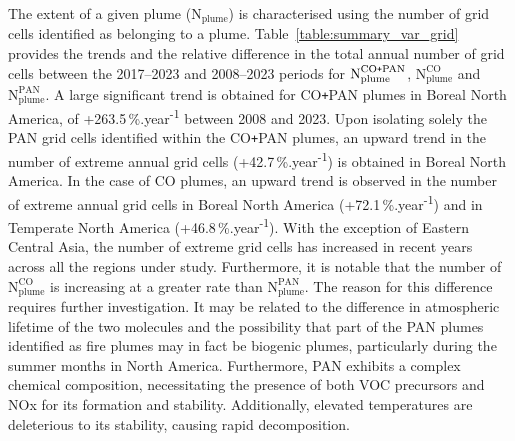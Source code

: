 \documentclass[acp, manuscript]{copernicus}
\begin{document}
The extent of a given plume ($\text{N}_{\text{plume}}$) is characterised using the number of grid cells identified as belonging to a plume. Table~\ref{table:summary_var_grid} provides the trends and the relative difference in the total annual number of grid cells between the 2017--2023 and 2008--2023 periods for $\text{N}_{\text{plume}}^{\text{CO\texttt{+}PAN}}$, $\text{N}_{\text{plume}}^{\text{CO}}$ and $\text{N}_{\text{plume}}^{\text{PAN}}$.
A large significant trend is obtained for CO\texttt{+}PAN plumes in Boreal North America, of +263.5\,\%.year\textsuperscript{-1} between 2008 and 2023. 
Upon isolating solely the PAN grid cells identified within the CO\texttt{+}PAN plumes, an upward trend in the number of extreme annual grid cells (+42.7\,\%.year\textsuperscript{-1}) is obtained in Boreal North America. In the case of CO plumes, an upward trend is observed in the number of extreme annual grid cells in Boreal North America (+72.1\,\%.year\textsuperscript{-1}) and in Temperate North America (+46.8\,\%.year\textsuperscript{-1}).
With the exception of Eastern Central Asia, the number of extreme grid cells has increased in recent years across all the regions under study. Furthermore, it is notable that the number of $\text{N}_{\text{plume}}^{\text{CO}}$ is increasing at a greater rate than $\text{N}_{\text{plume}}^{\text{PAN}}$. 
The reason for this difference requires further investigation. It may be related to the difference in atmospheric lifetime of the two molecules and the possibility that part of the PAN plumes identified as fire plumes may in fact be biogenic plumes, particularly during the summer months in North America. Furthermore, PAN exhibits a complex chemical composition, necessitating the presence of both VOC precursors and NOx for its formation and stability. Additionally, elevated temperatures are deleterious to its stability, causing rapid decomposition.


\end{document}
